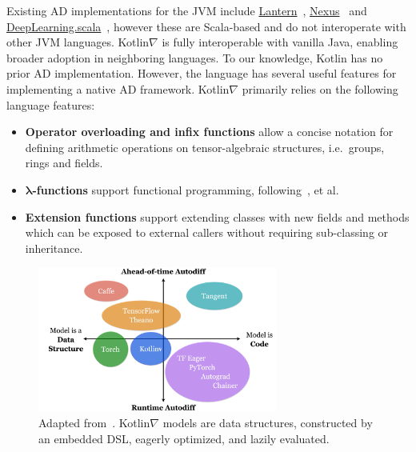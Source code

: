 \documentclass[12pt,initial,twoside,maitrise]{dms}
\numberwithin{equation}{section}
\numberwithin{table}{chapter}
\numberwithin{figure}{chapter}
\begin{document}
Existing AD implementations for the JVM include \href{https://feiwang3311.github.io/Lantern/}{Lantern}~\citep{wang2018demystifying}, \href{https://tongfei.me/nexus/}{Nexus}~\citep{chen2017typesafe} and \href{https://github.com/ThoughtWorksInc/DeepLearning.scala}{DeepLearning.scala}~\citep{yang2018dl4s}, however these are Scala-based and do not interoperate with other JVM languages. Kotlin$\nabla$ is fully interoperable with vanilla Java, enabling broader adoption in neighboring languages. To our knowledge, Kotlin has no prior AD implementation. However, the language has several useful features for implementing a native AD framework. Kotlin$\nabla$ primarily relies on the following language features:

\begin{itemize}
\item \textbf{Operator overloading and infix functions} allow a concise notation for defining arithmetic operations on tensor-algebraic structures, i.e.\ groups, rings and fields.
\item \textbf{$\mathbf{\lambda}$-functions} support functional programming, following~\citet{pearlmutter2008reverse, pearlmutter2008using, siskind2008nesting, elliott2009beautiful, elliott2018simple}, et al.
\item \textbf{Extension functions} support extending classes with new fields and methods which can be exposed to external callers without requiring sub-classing or inheritance.
\end{itemize}

\begin{figure}
    \centering
    \includegraphics[width=0.70\textwidth]{../figures/kotlingrad_diagram.png}
    \caption{Adapted from~\citet{van2018tangent}. Kotlin$\nabla$ models are data structures, constructed by an embedded DSL, eagerly optimized, and lazily evaluated.}
    \label{fig:kotlingrad_digram}
\end{figure}
\end{document}
